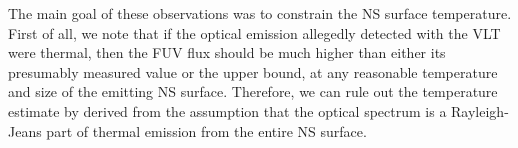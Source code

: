 \documentclass[pdftex,twocolumn]{aastex62}
\newcommand{\gp}[1]{{\color{blue} #1}}
\begin{document}
  The main goal of these observations was to constrain the NS surface temperature.
  First of all, we note that if the optical emission allegedly detected with the VLT  were thermal, then
  the FUV flux should 
  be much higher than either its presumably measured value or the upper bound, at any reasonable temperature and size of the emitting NS surface. 
 Therefore, we can rule out the temperature estimate by \citet{Mignani2008} derived from the assumption that the optical spectrum is a Rayleigh-Jeans part of thermal emission from the entire NS surface.

\end{document}
